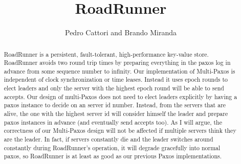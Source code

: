 \documentclass[a4paper]{article}
\title{RoadRunner}
\author{Pedro Cattori and Brando Miranda}
\begin{document}
\maketitle

\begin{abstract}
RoadRunner is a persistent, fault-tolerant, high-performance key-value store. 
RoadRunner avoids two round trip times by preparing everything in the paxos log in advance from some sequence number to infinity. 
Our implementation of Multi-Paxos is independent of clock synchronization or time leases. Instead it uses epoch rounds to elect leaders and only the server with the highest epoch round will be able to send accepts. 
Our design of multi-Paxos does not need to elect leaders explicitly by having a paxos instance to decide on an server id number.
Instead, from the servers that are alive, the one with the highest server id will consider himself the leader and prepare paxos instances in advance (and eventually send accepts too).
As I will argue, the correctness of our Multi-Paxos design will not be affected if multiple servers think they are the leader. In fact, if servers constantly die and the leader switches around constantly during RoadRunner's operation, it will degrade gracefully into normal paxos, so RoadRunner is at least as good as our previous Paxos implementations.
\end{abstract}
\end{document}
